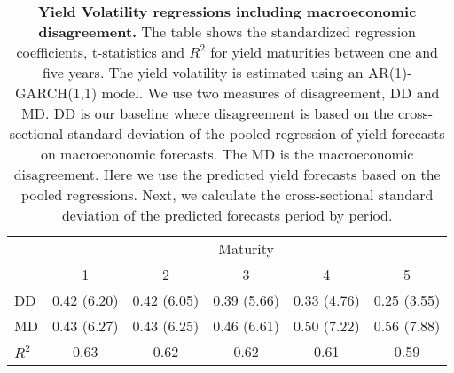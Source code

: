 \begin{table}[H]
\centering
\caption{\textbf{Yield Volatility regressions including macroeconomic disagreement.} The table shows the standardized regression coefficients, t-statistics and $R^2$ for yield maturities between one and five years. The yield volatility is estimated using an AR(1)-GARCH(1,1) model. We use two measures of disagreement, DD and MD. DD is our baseline where disagreement is based on the cross-sectional standard deviation of the pooled regression of yield forecasts on macroeconomic forecasts. The MD is the macroeconomic disagreement. Here we use the predicted yield forecasts based on the pooled regressions. Next, we calculate the cross-sectional standard deviation of the predicted forecasts period by period.}
\begin{tabular}{lccccc}
\hline
\hline& 
\multicolumn{5}{c}{Maturity} \\
 &  1 &  2 &  3 &  4 &  5 \\
\hline
DD      & 0.42 (6.20) & 0.42 (6.05) & 0.39 (5.66) & 0.33 (4.76) & 0.25 (3.55) \\
MD  & 0.43 (6.27) & 0.43 (6.25) & 0.46 (6.61) & 0.50 (7.22) & 0.56 (7.88) \\
$R^2$          & 0.63        & 0.62        & 0.62        & 0.61        & 0.59        \\
\hline
\end{tabular}
\end{table}

